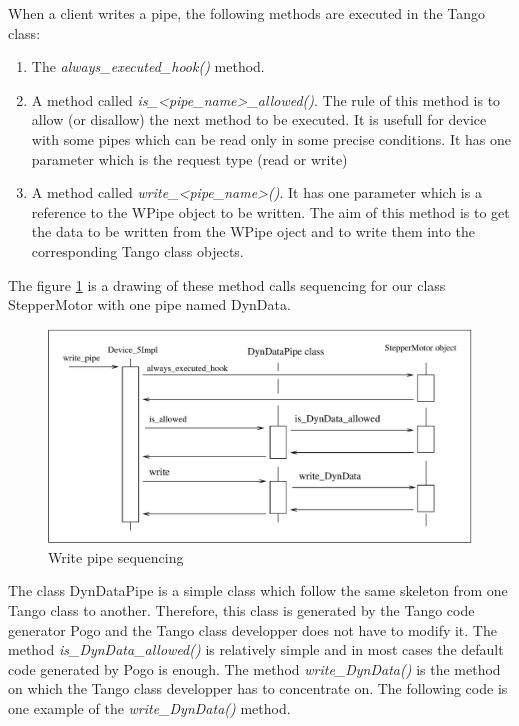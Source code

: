 When a client writes a pipe, the following methods are executed in
the Tango class:
\begin{enumerate}
\item The \emph{always\_executed\_hook()} method.
\item A method called \emph{is\_<pipe\_name>\_allowed()}. The rule of this
method is to allow (or disallow) the next method to be executed. It
is usefull for device with some pipes which can be read only in some
precise conditions. It has one parameter which is the request type
(read or write)
\item A method called \emph{write\_<pipe\_name>()}. It has one parameter
which is a reference to the WPipe object to be written. The aim of
this method is to get the data to be written from the WPipe oject
and to write them into the corresponding Tango class objects.
\end{enumerate}
The figure \ref{w_pipe_timing_fig-1-1} is a drawing of these method
calls sequencing for our class StepperMotor with one pipe named DynData.
\begin{figure}[H]
\begin{centering}
\includegraphics[scale=0.7]{ds_writing/w_pipe}
\par\end{centering}

\protect\caption{Write pipe sequencing\label{w_pipe_timing_fig-1-1}}
\end{figure}


The class DynDataPipe is a simple class which follow the same skeleton
from one Tango class to another. Therefore, this class is generated
by the Tango code generator Pogo and the Tango class developper does
not have to modify it. The method \emph{is\_DynData\_allowed()} is
relatively simple and in most cases the default code generated by
Pogo is enough. The method \emph{write\_DynData()} is the method on
which the Tango class developper has to concentrate on. The following
code is one example of the \emph{write\_DynData()} method.

